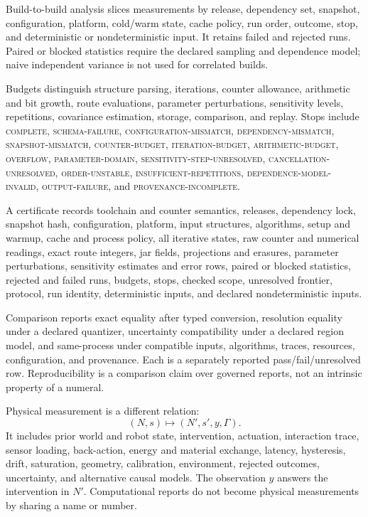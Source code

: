 Build-to-build analysis slices measurements by release, dependency set, snapshot, configuration, platform, cold/warm
state, cache policy, run order, outcome, stop, and deterministic or nondeterministic input.  It retains failed and
rejected runs.  Paired or blocked statistics require the declared sampling and dependence model; naive independent
variance is not used for correlated builds.

Budgets distinguish structure parsing, iterations, counter allowance, arithmetic and bit growth, route evaluations,
parameter perturbations, sensitivity levels, repetitions, covariance estimation, storage, comparison, and replay.
Stops include \textsc{complete}, \textsc{schema-failure}, \textsc{configuration-mismatch},
\textsc{dependency-mismatch}, \textsc{snapshot-mismatch}, \textsc{counter-budget},
\textsc{iteration-budget}, \textsc{arithmetic-budget}, \textsc{overflow},
\textsc{parameter-domain}, \textsc{sensitivity-step-unresolved}, \textsc{cancellation-unresolved},
\textsc{order-unstable}, \textsc{insufficient-repetitions}, \textsc{dependence-model-invalid},
\textsc{output-failure}, and \textsc{provenance-incomplete}.

A certificate records toolchain and counter semantics, releases, dependency lock, snapshot hash, configuration,
platform, input structures, algorithms, setup and warmup, cache and process policy, all iterative states, raw counter
and numerical readings, exact route integers, jar fields, projections and erasures, parameter perturbations,
sensitivity estimates and error rows, paired or blocked statistics, rejected and failed runs, budgets, stops, checked
scope, unresolved frontier, protocol, run identity, deterministic inputs, and declared nondeterministic inputs.

Comparison reports exact equality after typed conversion, resolution equality under a declared quantizer, uncertainty
compatibility under a declared region model, and same-process under compatible inputs, algorithms, traces, resources,
configuration, and provenance.  Each is a separately reported pass/fail/unresolved row.  Reproducibility is a comparison
claim over governed reports, not an intrinsic property of a numeral.

Physical measurement is a different relation:
\[
                         (N,s)\longmapsto(N',s',y,\Gamma).
\]
It includes prior world and robot state, intervention, actuation, interaction trace, sensor loading, back-action,
energy and material exchange, latency, hysteresis, drift, saturation, geometry, calibration, environment, rejected
outcomes, uncertainty, and alternative causal models.  The observation \(y\) answers the intervention in \(N'\).
Computational reports do not become physical measurements by sharing a name or number.

